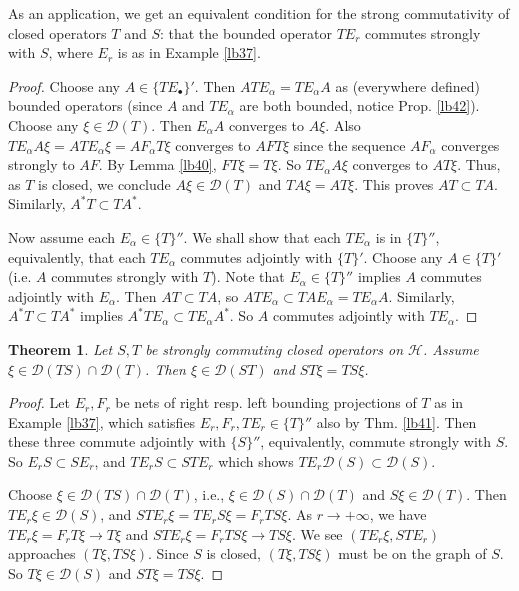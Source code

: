\documentclass[12pt,a4paper,notitlepage]{article}
\theoremstyle{definition}
\theoremstyle{plain}
\newtheorem{thm}[df]{Theorem}
\newcommand{\mc}{\mathcal}
\newcommand{\Dom}{\scr D}
\newcommand{\scr}{\mathscr}
\newcommand{\blt}{\bullet}
\numberwithin{equation}{section}
\begin{document}
As an application, we get an equivalent condition for the strong commutativity of closed operators $T$ and $S$: that the bounded operator $TE_r$ commutes strongly with $S$, where $E_r$ is as in Example \ref{lb37}.


\begin{proof}
Choose any $A\in\{TE_\blt\}'$. Then $ATE_\alpha=TE_\alpha A$ as (everywhere defined) bounded operators (since $A$ and $TE_\alpha$ are both bounded, notice Prop. \ref{lb42}).  Choose any $\xi\in\Dom(T)$. Then $E_\alpha A$ converges to $A\xi$. Also $TE_\alpha A\xi=ATE_\alpha\xi=AF_\alpha T\xi$ converges to $AFT\xi$ since the sequence $AF_\alpha$ converges strongly to $AF$. By Lemma \ref{lb40}, $FT\xi=T\xi$. So $TE_\alpha A\xi$ converges to $AT\xi$. Thus, as $T$ is closed, we conclude $A\xi\in\Dom(T)$ and $TA\xi=AT\xi$. This proves $AT\subset TA$. Similarly, $A^*T\subset TA^*$.
	
	
Now assume each $E_\alpha\in\{T\}''$. We shall show that each $TE_\alpha$ is in $\{T\}''$,  equivalently, that each $TE_\alpha$ commutes adjointly with $\{T\}'$. Choose any $A\in\{T\}'$ (i.e. $A$ commutes strongly with $T$). Note that $E_\alpha\in\{T\}''$ implies $A$ commutes adjointly with $E_\alpha$. Then $AT\subset TA$, so $ATE_\alpha\subset TAE_\alpha=TE_\alpha A$. Similarly, $A^*T\subset TA^*$ implies $A^*TE_\alpha\subset TE_\alpha A^*$. So $A$ commutes adjointly with $TE_\alpha$.
\end{proof}






\begin{thm}\label{lb38}
Let $S,T$ be strongly commuting closed operators on $\mc H$. Assume $\xi\in\Dom(TS)\cap\Dom(T)$. Then $\xi\in\Dom(ST)$ and $ST\xi=TS\xi$.
\end{thm}


\begin{proof}
Let $E_r,F_r$ be  nets of right resp. left bounding projections of $T$ as in Example \ref{lb37}, which satisfies $E_r,F_r,TE_r\in\{T\}''$ also by Thm. \ref{lb41}. Then these three commute adjointly with $\{S\}''$, equivalently, commute strongly with $S$. So $E_rS\subset SE_r$, and $TE_rS\subset STE_r$ which shows $TE_r\Dom(S)\subset\Dom(S)$. 

Choose $\xi\in\Dom(TS)\cap\Dom(T)$, i.e., $\xi\in\Dom(S)\cap\Dom(T)$ and $S\xi\in\Dom(T)$. Then $TE_r\xi\in\Dom(S)$, and $STE_r\xi=TE_rS\xi=F_rTS\xi$. As $r\rightarrow+\infty$, we have $TE_r\xi=F_rT\xi\rightarrow T\xi$ and $STE_r\xi=F_rTS\xi\rightarrow TS\xi$. We see $(TE_r\xi,STE_r)$ approaches $(T\xi,TS\xi)$. Since $S$ is closed, $(T\xi,TS\xi)$ must be on the graph of $S$. So $T\xi\in\Dom(S)$ and $ST\xi=TS\xi$.
\end{proof}
\end{document}
